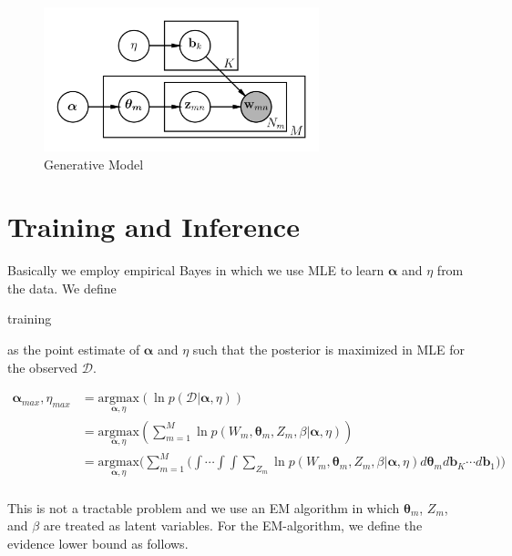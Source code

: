 \documentclass[a4]{article}
\begin{document}
\begin{figure}
\centering
\includegraphics[width=8cm]{lda_modelling.png}
\caption{Generative Model}
\label{fig:generative model}
\end{figure}




\section{Training and Inference}
Basically we employ empirical Bayes in which we use MLE to learn 
$\bm{\alpha}$ and $\eta$ from the data.
We define \begin{bf}training\end{bf} as the point estimate of $\bm{\alpha}$ and $\eta$ such that
the posterior is maximized in MLE for the observed $\mathcal{D}$.

\begin{equation}
\begin{aligned}
\bm{\alpha}_{max}, \eta_{max} &= \underset{\bm{\alpha},\eta}{\mathrm{argmax}} \left( \ln p( \mathcal{D} | \bm{\alpha}, \eta ) \right)\\
&= \underset{\bm{\alpha},\eta}{\mathrm{argmax}} \left( \sum_{m=1}^M
\ln p( W_m, \bm{\theta}_m, Z_m, \beta | \bm{\alpha}, \eta ) 
\right)\\
&= \underset{\bm{\alpha},\eta}{\mathrm{argmax}} \Big( \sum_{m=1}^M \Big(
      \int\cdots\int\int
      \sum_{Z_{m}} \ln p( W_m, \bm{\theta}_m, Z_m, \beta | 
      \bm{\alpha}, \eta ) d\bm{\theta}_m
      d\mathbf{b}_K \cdots d\mathbf{b}_1
\Big)\Big)\label{MLE_alpha_eta}\\
\end{aligned}
\end{equation}

This is not a tractable problem and we use an EM algorithm in which
$\bm{\theta}_m$, $Z_m$, and $\beta$ are treated as latent variables.
For the EM-algorithm, we define the evidence lower bound as follows.
\end{document}

